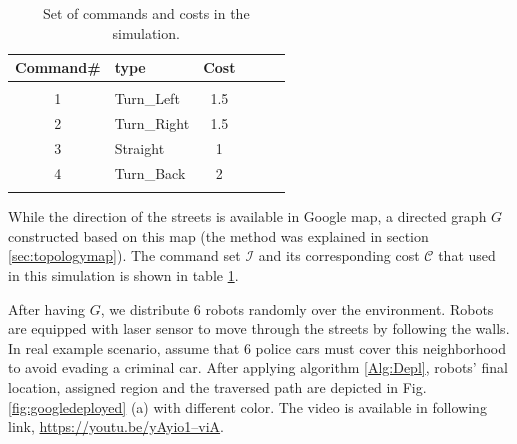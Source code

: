 \documentclass[twocolumn]{svjour3}       %
\begin{document}
\begin{table}[t]
\centering
\caption{Set of commands and costs in the simulation.}
\label{tbl:commandsets}
\begin{tabular}{cm{1.5cm}cm{1.9cm}cm{1.8cm}}
Command\#  & type  & Cost    \\
\hline\\
1 & Turn\_Left &  1.5 \\
2 & Turn\_Right& 1.5\\
3 & Straight &  1\\
4 & Turn\_Back & 2\\
\hline\\
\end{tabular}
\end{table}

%
While the direction of the streets is available in Google map, a directed graph $G$ constructed based on this map (the method was explained in section \ref{sec:topologymap}). The command set $\mathcal{I}$ and its corresponding cost $\mathcal{C}$ that used in this simulation is shown in table \ref{tbl:commandsets}.

%
After having $G$, we distribute 6 robots randomly over the environment. Robots are equipped with laser sensor to move through the streets by following the walls. 
%
In real example scenario, assume that 6 police cars must cover this neighborhood to avoid evading a criminal car. After applying algorithm \ref{Alg:Depl}, robots' final location, assigned region and the traversed path are depicted in Fig. \ref{fig:googledeployed} (a) with different color. The video is available in following link, \href{https://youtu.be/yAyio1--viA}{https://youtu.be/yAyio1--viA}.
\end{document}
